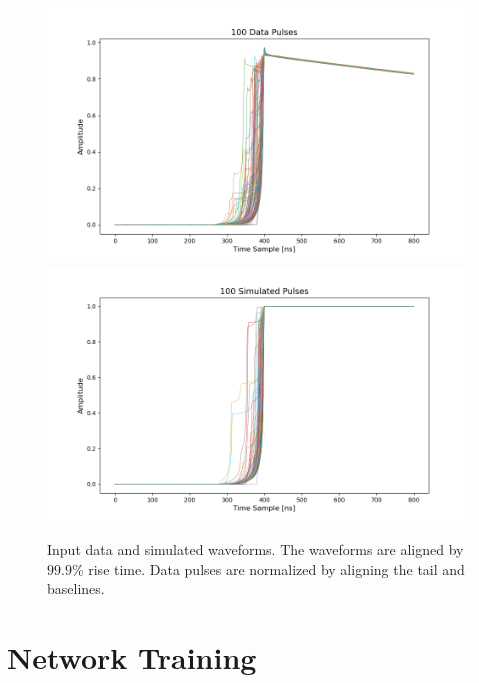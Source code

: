 \begin{figure}%
    \centering
    \includegraphics[width=0.9\linewidth,trim={4pc 0cm 6pc 1cm},clip]{ch7/figs/all_data_pulses.png}
    \includegraphics[width=0.9\linewidth,trim={4pc 0cm 6pc 1cm},clip]{ch7/figs/all_simulated_pulses.png}
    \caption{Input data and simulated waveforms. The waveforms are aligned by $99.9\%$ rise time. Data pulses are normalized by aligning the tail and baselines.}
   \label{ch7:figs:in_out}
\end{figure}

\section{Network Training}

